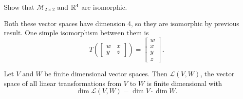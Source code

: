 \begin{example}
	Show that $\mathcal{M}_{2 \times 2}$ and $\mathbb{R}^4$ are isomorphic.
\end{example}
\begin{answer}
	Both these vector spaces have dimension 4, so they are isomorphic by previous result.
	One simple isomorphism between them is
	\begin{equation*}
		T\left(\begin{bmatrix}
			w & x \\ y & z
		\end{bmatrix}\right) = \begin{bmatrix}
			w \\ x \\ y \\ z
		\end{bmatrix}.
	\end{equation*}
\end{answer}

\begin{theorem}
	Let $V$ and $W$ be finite dimensional vector spaces.
	Then $\mathcal{L}(V,W)$, the vector space of all linear transformations from $V$ to $W$ is finite dimensional with
	\begin{equation*}
		\dim{\mathcal{L}(V,W)} = \dim{V} \cdot \dim{W}.
	\end{equation*}
\end{theorem}